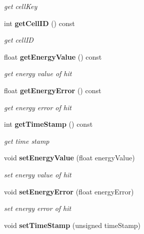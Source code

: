 \begin{DoxyCompactItemize}
\begin{DoxyCompactList}\small\item\em get cellKey \item\end{DoxyCompactList}\item 
int {\bf getCellID} () const \label{classCALICE_1_1TcmtHit_a79ef589b9f3790e668d08166b247e120}

\begin{DoxyCompactList}\small\item\em get cellID \item\end{DoxyCompactList}\item 
float {\bf getEnergyValue} () const \label{classCALICE_1_1TcmtHit_a9b11690c240caed823bbdd2daea1652e}

\begin{DoxyCompactList}\small\item\em get energy value of hit \item\end{DoxyCompactList}\item 
float {\bf getEnergyError} () const \label{classCALICE_1_1TcmtHit_a04e6e33a6a5bedd924d6f4bee389d7c4}

\begin{DoxyCompactList}\small\item\em get energy error of hit \item\end{DoxyCompactList}\item 
int {\bf getTimeStamp} () const \label{classCALICE_1_1TcmtHit_a7e01c36b8b02e069b24c0592b0710d88}

\begin{DoxyCompactList}\small\item\em get time stamp \item\end{DoxyCompactList}\item 
void {\bf setEnergyValue} (float energyValue)\label{classCALICE_1_1TcmtHit_a9e1a69cc5e1c5387c20f584e75a708b8}

\begin{DoxyCompactList}\small\item\em set energy value of hit \item\end{DoxyCompactList}\item 
void {\bf setEnergyError} (float energyError)\label{classCALICE_1_1TcmtHit_a4e7dc7885f661827c0df8b50724c9be3}

\begin{DoxyCompactList}\small\item\em set energy error of hit \item\end{DoxyCompactList}\item 
void {\bf setTimeStamp} (unsigned timeStamp)\label{classCALICE_1_1TcmtHit_a530792c19fdd0f5aa5b788e1b5ae6043}


\end{DoxyCompactItemize}
